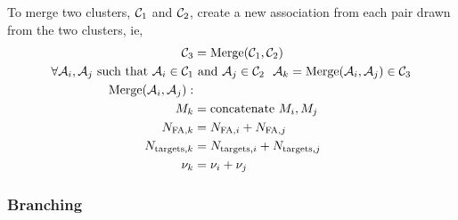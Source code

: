 \documentclass[12pt]{article}
\newcommand{\cA}{{\cal A}}
\newcommand{\cC}{{\cal C}}
\begin{document}
To merge two clusters, $\cC_1$ and $\cC_2$, create a new association
from each pair drawn from the two clusters, ie,
\begin{align}
   \cC_3 &= \text{Merge}(\cC_1,\cC_2) \\
  \forall \cA_{i}, \cA_{j} \text{ such that } \cA_{i} \in \cC_1 &\text{
    and } \cA_{j} \in \cC_2 ~~ \cA_k = \text{Merge}(\cA_{i}, \cA_{j})
  \in \cC_3 \\
  \text{Merge}(\cA_{i}, \cA_{j}): \\
  M_k &= \text{concatenate } M_i, M_j \\
  N_{\text{FA},k} &= N_{\text{FA},i} + N_{\text{FA},j} \\
  N_{\text{targets},k} &= N_{\text{targets},i} + N_{\text{targets},j}
  \\
  \nu_k &= \nu_i +\nu_j
\end{align}

\subsubsection{Branching}
\label{sec:branching}
\end{document}
